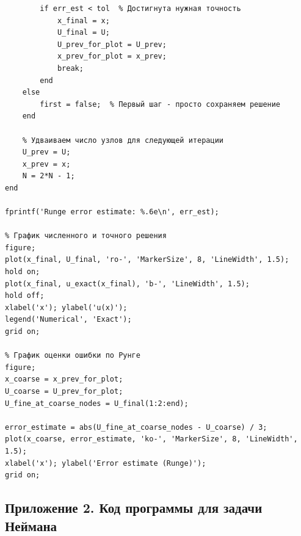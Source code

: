\documentclass[14pt,a4paper]{extarticle}  %
\numberwithin{equation}{section}
\begin{document}
\begin{verbatim}
        if err_est < tol  % Достигнута нужная точность
            x_final = x;
            U_final = U;
            U_prev_for_plot = U_prev;
            x_prev_for_plot = x_prev;
            break;
        end
    else
        first = false;  % Первый шаг - просто сохраняем решение
    end

    % Удваиваем число узлов для следующей итерации
    U_prev = U;
    x_prev = x;
    N = 2*N - 1;
end

fprintf('Runge error estimate: %.6e\n', err_est);

% График численного и точного решения
figure;
plot(x_final, U_final, 'ro-', 'MarkerSize', 8, 'LineWidth', 1.5);
hold on;
plot(x_final, u_exact(x_final), 'b-', 'LineWidth', 1.5);
hold off;
xlabel('x'); ylabel('u(x)');
legend('Numerical', 'Exact');
grid on;

% График оценки ошибки по Рунге
figure;
x_coarse = x_prev_for_plot;
U_coarse = U_prev_for_plot;
U_fine_at_coarse_nodes = U_final(1:2:end);

error_estimate = abs(U_fine_at_coarse_nodes - U_coarse) / 3;
plot(x_coarse, error_estimate, 'ko-', 'MarkerSize', 8, 'LineWidth', 1.5);
xlabel('x'); ylabel('Error estimate (Runge)');
grid on;
\end{verbatim}

\subsection*{Приложение 2. Код программы для задачи Неймана}
\label{app:neumann}
\end{document}
